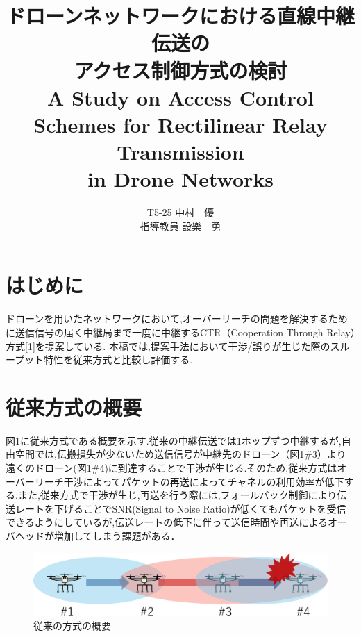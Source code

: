 \documentclass[a4paper,10pt]{ltjsarticle}
\title{\huge ドローンネットワークにおける直線中継伝送の\\アクセス制御方式の検討\\
\Large A Study on Access Control Schemes for Rectilinear Relay Transmission \\in Drone Networks
}
\author{
T5-25 \:中村　優\\
指導教員 \: 設樂　勇
}
\date{}
\begin{document}
\twocolumn[
\maketitle
]

\section{はじめに}
ドローンを用いたネットワークにおいて,オーバーリーチの問題を解決するために送信信号の届く中継局まで一度に中継するCTR（Cooperation Through Relay）方式[1]を提案している. 本稿では,提案手法において干渉/誤りが生じた際のスループット特性を従来方式と比較し評価する.
\section{従来方式の概要}
図1に従来方式である概要を示す.従来の中継伝送では1ホップずつ中継するが,自由空間では,伝搬損失が少ないため送信信号が中継先のドローン（図1\#3）より遠くのドローン(図1\#4)に到達することで干渉が生じる.そのため,従来方式はオーバーリーチ干渉によってパケットの再送によってチャネルの利用効率が低下する.また,従来方式で干渉が生じ,再送を行う際には,フォールバック制御により伝送レートを下げることでSNR(Signal to Noise Ratio)が低くてもパケットを受信できるようにしているが,伝送レートの低下に伴って送信時間や再送によるオーバヘッドが増加してしまう課題がある．%

\begin{figure}[H]
  \centering
  \includegraphics[width=\linewidth]{cenventional_topology.pdf} %
  \caption{従来の方式の概要}
  \label{fig:従来の方式のトポロジー} %
\end{figure}
\end{document}

